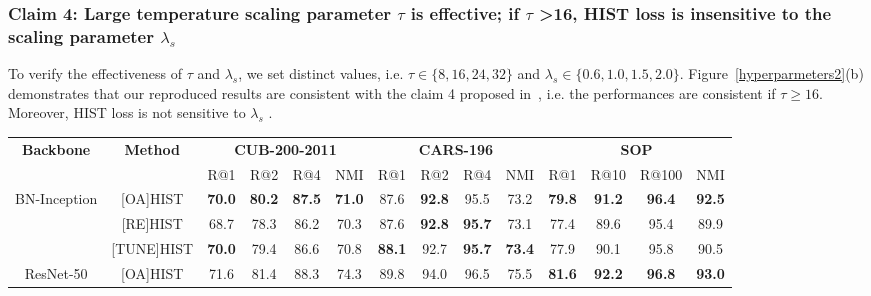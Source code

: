 \subsubsection{Claim 4: Large temperature scaling parameter $\tau$ is effective; if $\tau$ >16, HIST loss is insensitive to the scaling parameter $\lambda_s$} To verify the effectiveness of $\tau$ and $\lambda_s$, we set distinct values, i.e. $\tau\in\{8, 16, 24, 32\}$ and $\lambda_s\in\{0.6, 1.0, 1.5, 2.0\}$. Figure~\ref{hyperparmeters2}(b) demonstrates that our reproduced results are consistent with the claim 4 proposed in~\cite{lim2022hypergraph}, i.e. the performances are consistent if $\tau\geq 16$. Moreover, HIST loss is not sensitive to $\lambda_s$ .

\begin{table}[ht!]
\centering
\setlength{\tabcolsep}{0.23mm}
\begin{tabular}{cccccccccccccc}
\toprule[0.8pt]
\multirow{2}{*}{\textbf{Backbone}}     & \multirow{2}{*}{\textbf{Method}} & \multicolumn{4}{c}{\textbf{CUB-200-2011}}                              & \multicolumn{4}{c}{\textbf{CARS-196}}                                  & \multicolumn{4}{c}{\textbf{SOP}}                                       \\ \cline{3-14} 
                              &                         & R@1           & R@2           & R@4           & NMI           & R@1           & R@2           & R@4           & NMI           & R@1           & R@10          & R@100         & NMI           \\ \hline \hline
\multirow{3}{*}{BN-Inception} & {[}OA{]}HIST            & \textbf{70.0} & \textbf{80.2} & \textbf{87.5} & \textbf{71.0} & 87.6          & \textbf{92.8}          & 95.5          & 73.2          & \textbf{79.8} & \textbf{91.2} & \textbf{96.4} & \textbf{92.5} \\
                              & {[}RE{]}HIST            & 68.7          & 78.3          & 86.2          & 70.3          & 87.6          & \textbf{92.8}          & \textbf{95.7} & 73.1          & 77.4          & 89.6          & 95.4          & 89.9          \\
                              & {[}TUNE{]}HIST          & \textbf{70.0}          & 79.4          & 86.6          & 70.8          & \textbf{88.1} & 92.7 & \textbf{95.7}          & \textbf{73.4} & 77.9          & 90.1          & 95.8          & 90.5          \\ \hline \hline
\multirow{3}{*}{ResNet-50}     & {[}OA{]}HIST            & 71.6          & 81.4          & 88.3          & 74.3          & 89.8          & 94.0          & 96.5          & 75.5          & \textbf{81.6} & \textbf{92.2} & \textbf{96.8} & \textbf{93.0} \\

\end{tabular}
\end{table}
